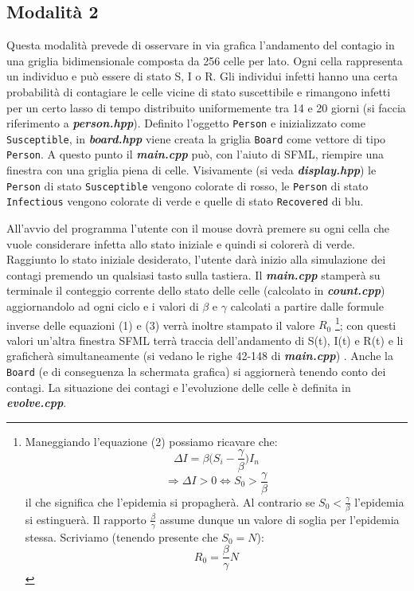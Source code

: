 \documentclass[a4paper,10 pt]{article}
\begin{document}
\subsection{Modalità 2}
Questa modalità prevede di osservare in via grafica l'andamento del contagio in una griglia bidimensionale composta da 256 celle per lato. Ogni cella rappresenta un individuo e può essere di stato S, I o R. Gli individui infetti hanno una certa probabilità di contagiare le celle vicine di stato suscettibile e rimangono infetti per un certo lasso di tempo distribuito uniformemente tra 14 e 20 giorni (si faccia riferimento a \textbf{\textit{person.hpp}}). Definito l'oggetto \verb!Person! e inizializzato come \verb!Susceptible!, in \textbf{\textit{board.hpp}} viene creata la griglia \verb!Board! come vettore di tipo  \verb!Person!. A questo punto il \textbf{\textit{main.cpp}} può, con l'aiuto di SFML, riempire una finestra con una griglia piena di celle. Visivamente (si veda  \textbf{\textit{display.hpp}}) le \verb!Person! di stato \verb!Susceptible! vengono colorate di rosso, le \verb!Person! di stato \verb!Infectious! vengono colorate di verde e quelle di stato \verb!Recovered! di blu.

All'avvio del programma l'utente con il mouse dovrà premere su ogni cella che vuole considerare infetta allo stato iniziale e quindi si colorerà di verde. Raggiunto lo stato iniziale desiderato, l'utente darà inizio alla simulazione dei contagi premendo un qualsiasi tasto sulla tastiera. Il \textbf{\textit{main.cpp}} stamperà su terminale il conteggio corrente dello stato delle celle (calcolato in \textbf{\textit{count.cpp}}) aggiornandolo ad ogni ciclo e i valori di $\beta$ e $\gamma$ calcolati a partire dalle formule inverse delle equazioni (1) e (3) verrà inoltre stampato il valore $R_0$ 
\footnote{
  Maneggiando l'equazione (2) possiamo ricavare che:
  $$
    \Delta I = \beta \big( S_i - \frac{\gamma}{\beta} \big) I_n
  $$
  $$
    \Rightarrow \Delta I > 0 \Leftrightarrow S_0 > \frac{\gamma}{\beta}
  $$ il che significa che l'epidemia si propagherà. Al contrario se $S_0 < \frac{\gamma}{\beta}$
  l'epidemia si estinguerà. Il rapporto $\frac{\beta}{\gamma}$ assume dunque un valore di soglia per l'epidemia
  stessa. Scriviamo (tenendo presente che $S_0 = N$):
  $$
    R_0 = \frac{\beta}{\gamma} N 
  $$
}; con questi valori un'altra finestra SFML terrà traccia dell'andamento di S(t), I(t) e R(t) e li graficherà simultaneamente (si vedano le righe 42-148 di \textbf{\textit{main.cpp}}) . Anche la \verb!Board! (e di conseguenza la schermata grafica) si aggiornerà tenendo conto dei contagi. La situazione dei contagi e l'evoluzione delle celle è definita in \textbf{\textit{evolve.cpp}}.
\end{document}
